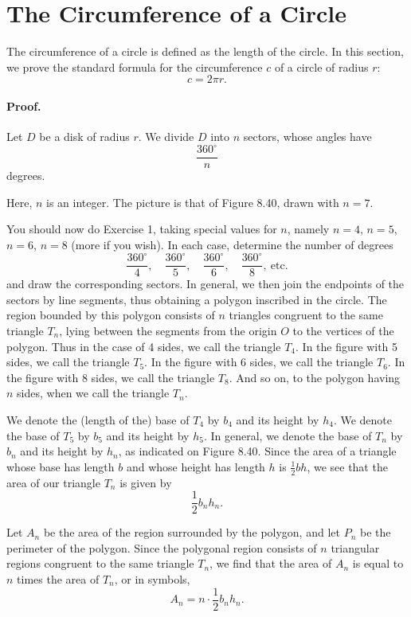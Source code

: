 \documentclass[12pt]{book} %
\begin{document}
\section{The Circumference of a Circle}

The circumference of a circle is defined as the length of the circle. In this section, we prove the standard formula for the circumference $c$ of a circle of radius $r$:
\[
c=2\pi r.
\]

\paragraph{Proof.}
Let $D$ be a disk of radius $r$. We divide $D$ into $n$ sectors, whose angles have
\[
\frac{360^\circ}{n}
\]
degrees.

Here, $n$ is an integer. The picture is that of Figure 8.40, drawn with $n=7$.


You should now do Exercise 1, taking special values for $n$, namely $n=4$, $n=5$, $n=6$, $n=8$ (more if you wish). In each case, determine the number of degrees
\[
\frac{360^\circ}{4},\quad \frac{360^\circ}{5},\quad \frac{360^\circ}{6},\quad \frac{360^\circ}{8},\ \text{etc.}
\]
and draw the corresponding sectors. In general, we then join the endpoints of the sectors by line segments, thus obtaining a polygon inscribed in the circle. The region bounded by this polygon consists of $n$ triangles congruent to the same triangle $T_n$, lying between the segments from the origin $O$ to the vertices of the polygon. Thus in the case of 4 sides, we call the triangle $T_4$. In the figure with 5 sides, we call the triangle $T_5$. In the figure with 6 sides, we call the triangle $T_6$. In the figure with 8 sides, we call the triangle $T_8$. And so on, to the polygon having $n$ sides, when we call the triangle $T_n$.

We denote the (length of the) base of $T_4$ by $b_4$ and its height by $h_4$. We denote the base of $T_5$ by $b_5$ and its height by $h_5$. In general, we denote the base of $T_n$ by $b_n$ and its height by $h_n$, as indicated on Figure 8.40. Since the area of a triangle whose base has length $b$ and whose height has length $h$ is $\frac12 bh$, we see that the area of our triangle $T_n$ is given by
\[
\frac12 b_n h_n.
\]

Let $A_n$ be the area of the region surrounded by the polygon, and let $P_n$ be the perimeter of the polygon. Since the polygonal region consists of $n$ triangular regions congruent to the same triangle $T_n$, we find that the area of $A_n$ is equal to $n$ times the area of $T_n$, or in symbols,
\[
A_n=n\cdot \frac12 b_n h_n.
\]
\end{document}
